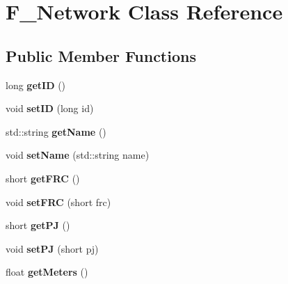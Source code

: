 \hypertarget{classF__Network}{}\section{F\+\_\+\+Network Class Reference}
\label{classF__Network}
\subsection*{Public Member Functions}
\begin{DoxyCompactItemize}
\item 
long {\bfseries get\+ID} ()\hypertarget{classF__Network_afe3448eae6ebf3b1c1fff6995d1caf16}{}\label{classF__Network_afe3448eae6ebf3b1c1fff6995d1caf16}

\item 
void {\bfseries set\+ID} (long id)\hypertarget{classF__Network_a0d8d9a64fd006dd485098f8f68eb0c5a}{}\label{classF__Network_a0d8d9a64fd006dd485098f8f68eb0c5a}

\item 
std\+::string {\bfseries get\+Name} ()\hypertarget{classF__Network_afed1d6b4322094a5037a6d1adcfde79d}{}\label{classF__Network_afed1d6b4322094a5037a6d1adcfde79d}

\item 
void {\bfseries set\+Name} (std\+::string name)\hypertarget{classF__Network_aac02ddc9d04a1bca591f6e79d71d028c}{}\label{classF__Network_aac02ddc9d04a1bca591f6e79d71d028c}

\item 
short {\bfseries get\+F\+RC} ()\hypertarget{classF__Network_a3e5276ff588e0b14820640478d9750cf}{}\label{classF__Network_a3e5276ff588e0b14820640478d9750cf}

\item 
void {\bfseries set\+F\+RC} (short frc)\hypertarget{classF__Network_abd35da121010afbd4e7e6b9e4a1de8ab}{}\label{classF__Network_abd35da121010afbd4e7e6b9e4a1de8ab}

\item 
short {\bfseries get\+PJ} ()\hypertarget{classF__Network_a856941bbb1c05bc8447dbfbe7bfc5633}{}\label{classF__Network_a856941bbb1c05bc8447dbfbe7bfc5633}

\item 
void {\bfseries set\+PJ} (short pj)\hypertarget{classF__Network_a43fa2299130f45951937cefba4e99067}{}\label{classF__Network_a43fa2299130f45951937cefba4e99067}

\item 
float {\bfseries get\+Meters} ()\hypertarget{classF__Network_ae9794e1fc86409d3d46ee63747d9573f}{}\label{classF__Network_ae9794e1fc86409d3d46ee63747d9573f}


\end{DoxyCompactItemize}
